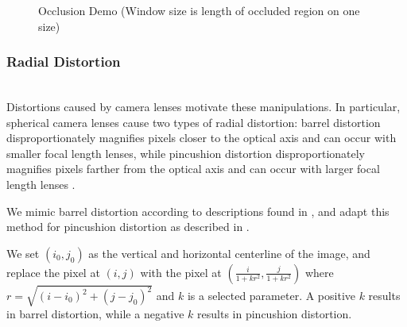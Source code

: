 \documentclass[pageno]{cos429}
\begin{document}
\begin{figure}[!htb]
\caption{Occlusion Demo (Window size is length of occluded region on one size)}
\label{fig:manipulationdemo_occlusion}
\end{figure}

\subsubsection{Radial Distortion}\hspace*{\fill} \\
Distortions caused by camera lenses motivate these manipulations. In particular, spherical camera lenses cause two types of radial distortion: barrel distortion disproportionately magnifies pixels closer to the optical axis and can occur with smaller focal length lenses, while pincushion distortion disproportionately magnifies pixels farther from the optical axis and can occur with larger focal length lenses \cite{drap_exact_2016}.

We mimic barrel distortion according to descriptions found in \cite{gribbon_real-time_2003}, and adapt this method for pincushion distortion as described in \cite{drap_exact_2016}.

We set $(i_0,j_0)$ as the vertical and horizontal centerline of the image, and replace the pixel at $(i,j)$ with the pixel at $(\frac{i}{1+kr^2},\frac{j}{1+kr^2})$ where $r=\sqrt{(i-i_0)^2+(j-j_0)^2}$ and $k$ is a selected parameter. A positive $k$ results in barrel distortion, while a negative $k$ results in pincushion distortion.
\end{document}
